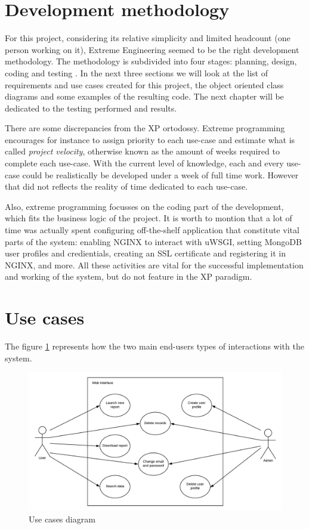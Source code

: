 \section{Development methodology}
For this project, considering its relative simplicity and limited headcount
(one person working on it), Extreme Engineering seemed to be the right
development methodology. The methodology is subdivided into four stages:
planning, design, coding and testing \cite{RP05}. In the next three sections we
will look at the list of requirements and use cases created for this
project, the object oriented class diagrams and some examples of the resulting
code. The next chapter will be dedicated to the testing performed and results.

There are some discrepancies from the XP ortodossy. Extreme programming
encourages for instance to assign priority to each use-case and estimate what is
called \emph{project velocity}, otherwise known as the amount of weeks required
to complete each use-case. With the current level of knowledge, each and every
use-case could be realistically be developed under a week of full time work.
However that did not reflects the reality of time dedicated to each use-case.

Also, extreme programming focusses on the coding part of the development, which
fits the business logic of the project. It is worth to montion that a lot of
time was actually spent configuring off-the-shelf application that constitute
vital parts of the system: enabling NGINX to interact with uWSGI, setting
MongoDB user profiles and credientials, creating an SSL certificate and
registering it in NGINX, and more. All these activities are vital for the
successful implementation and working of the system, but do not feature in the
XP paradigm.


\section{Use cases}
The figure \ref{fig:usecases} represents how the two main end-users types of 
interactions with the system.

\begin{figure}[h!]
\centering
\includegraphics[scale=0.6]{imgs/UseCasesDiag.pdf}
\caption{Use cases diagram}
\label{fig:usecases}
\end{figure}

